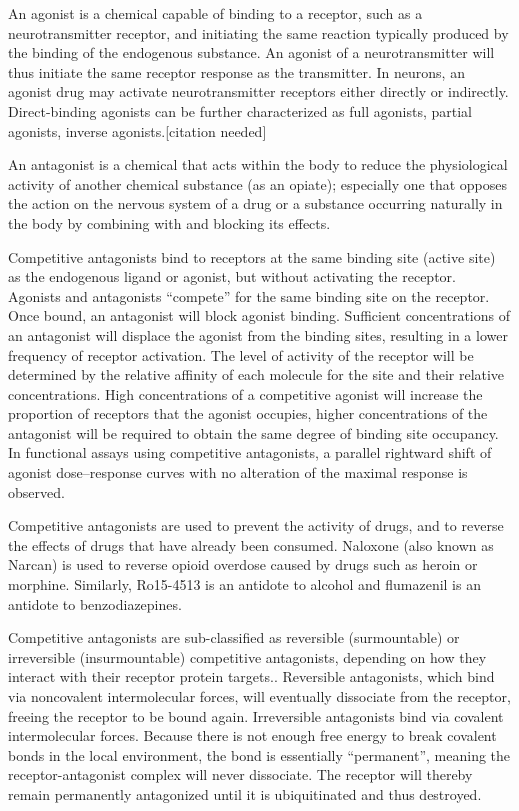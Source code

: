 An agonist is a chemical capable of binding to a receptor, such as a neurotransmitter receptor, and initiating the same reaction typically produced by the binding of the endogenous substance. An agonist of a neurotransmitter will thus initiate the same receptor response as the transmitter. In neurons, an agonist drug may activate neurotransmitter receptors either directly or indirectly. Direct-binding agonists can be further characterized as full agonists, partial agonists, inverse agonists.{[}citation needed{]}

An antagonist is a chemical that acts within the body to reduce the physiological activity of another chemical substance (as an opiate); especially one that opposes the action on the nervous system of a drug or a substance occurring naturally in the body by combining with and blocking its effects.

Competitive antagonists bind to receptors at the same binding site (active site) as the endogenous ligand or agonist, but without activating the receptor. Agonists and antagonists ``compete'' for the same binding site on the receptor. Once bound, an antagonist will block agonist binding. Sufficient concentrations of an antagonist will displace the agonist from the binding sites, resulting in a lower frequency of receptor activation. The level of activity of the receptor will be determined by the relative affinity of each molecule for the site and their relative concentrations. High concentrations of a competitive agonist will increase the proportion of receptors that the agonist occupies, higher concentrations of the antagonist will be required to obtain the same degree of binding site occupancy. In functional assays using competitive antagonists, a parallel rightward shift of agonist dose--response curves with no alteration of the maximal response is observed.

Competitive antagonists are used to prevent the activity of drugs, and to reverse the effects of drugs that have already been consumed. Naloxone (also known as Narcan) is used to reverse opioid overdose caused by drugs such as heroin or morphine. Similarly, Ro15-4513 is an antidote to alcohol and flumazenil is an antidote to benzodiazepines.

Competitive antagonists are sub-classified as reversible (surmountable) or irreversible (insurmountable) competitive antagonists, depending on how they interact with their receptor protein targets.. Reversible antagonists, which bind via noncovalent intermolecular forces, will eventually dissociate from the receptor, freeing the receptor to be bound again. Irreversible antagonists bind via covalent intermolecular forces. Because there is not enough free energy to break covalent bonds in the local environment, the bond is essentially ``permanent'', meaning the receptor-antagonist complex will never dissociate. The receptor will thereby remain permanently antagonized until it is ubiquitinated and thus destroyed.

